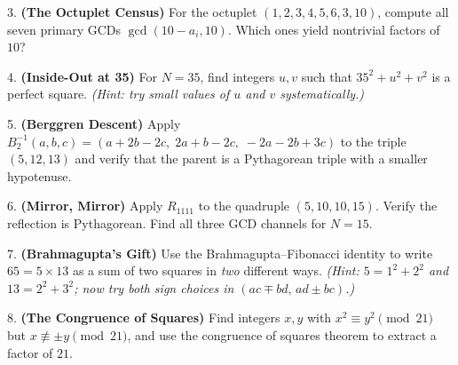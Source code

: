 3. \textbf{(The Octuplet Census)} For the octuplet $(1, 2, 3, 4, 5, 6, 3, 10)$, compute all seven primary GCDs $\gcd(10 - a_i, 10)$. Which ones yield nontrivial factors of $10$?

4. \textbf{(Inside-Out at 35)} For $N = 35$, find integers $u, v$ such that $35^2 + u^2 + v^2$ is a perfect square. \textit{(Hint: try small values of $u$ and $v$ systematically.)}

5. \textbf{(Berggren Descent)} Apply $B_2^{-1}(a, b, c) = (a + 2b - 2c,\; 2a + b - 2c,\; -2a - 2b + 3c)$ to the triple $(5, 12, 13)$ and verify that the parent is a Pythagorean triple with a smaller hypotenuse.

6. \textbf{(Mirror, Mirror)} Apply $R_{1111}$ to the quadruple $(5, 10, 10, 15)$. Verify the reflection is Pythagorean. Find all three GCD channels for $N = 15$.

7. \textbf{(Brahmagupta's Gift)} Use the Brahmagupta--Fibonacci identity to write $65 = 5 \times 13$ as a sum of two squares in \textit{two} different ways. \textit{(Hint: $5 = 1^2 + 2^2$ and $13 = 2^2 + 3^2$; now try both sign choices in $(ac \mp bd, \, ad \pm bc)$.)}

8. \textbf{(The Congruence of Squares)} Find integers $x, y$ with $x^2 \equiv y^2 \pmod{21}$ but $x \not\equiv \pm y \pmod{21}$, and use the congruence of squares theorem to extract a factor of $21$.
